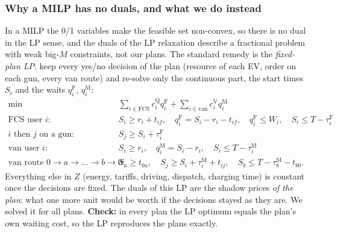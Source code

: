 \documentclass[11pt,a4paper]{article}
\begin{document}
\subsubsection{Why a MILP has no duals, and what we do instead}
In a MILP the 0/1 variables make the feasible set non-convex, so there is no dual in the LP sense, and the duals of the LP relaxation describe a fractional problem with weak big-$M$ constraints, not our plans. The standard remedy is the \emph{fixed-plan LP}: keep every yes/no decision of the plan (resource of each EV, order on each gun, every van route) and re-solve only the continuous part, the start times $S_i$ and the waits $q^{\mathrm F}_i$, $q^{\mathrm M}_i$:
\begin{align*}
\min\ & \textstyle\sum_{i\in\text{FCS}} c^{\mathrm Q}_i q^{\mathrm F}_i+\sum_{i\in\text{van}} c^{\mathrm V}_i q^{\mathrm M}_i\\
\text{FCS user } i:\ & S_i\ge r_i+t_{if},\quad q^{\mathrm F}_i=S_i-r_i-t_{if},\quad q^{\mathrm F}_i\le W_i,\quad S_i\le T-\tau^{\mathrm F}_i\\
i\text{ then }j\text{ on a gun}:\ & S_j\ge S_i+\tau^{\mathrm F}_i\\
\text{van user } i:\ & S_i\ge r_i,\quad q^{\mathrm M}_i=S_i-r_i,\quad S_i\le T-\tau^{\mathrm M}_i\\
\text{van route } 0\to a\to\dots\to b\to0:\ & S_a\ge t_{0a},\quad S_j\ge S_i+\tau^{\mathrm M}_i+t_{ij},\quad S_b\le T-\tau^{\mathrm M}_b-t_{b0}.
\end{align*}
Everything else in $Z$ (energy, tariffs, driving, dispatch, charging time) is constant once the decisions are fixed. The duals of this LP are the shadow prices \emph{of the plan}: what one more unit would be worth if the decisions stayed as they are. We solved it for all \NValid{} plans. \textbf{Check:} in every plan the LP optimum equals the plan's own waiting cost, so the LP reproduces the plans exactly.

\begin{table}[H]
\centering\footnotesize
\caption{Shadow prices of the fixed-plan LPs, all valid plans (absolute values).}
\label{tab:duals}

\end{table}
\end{document}
